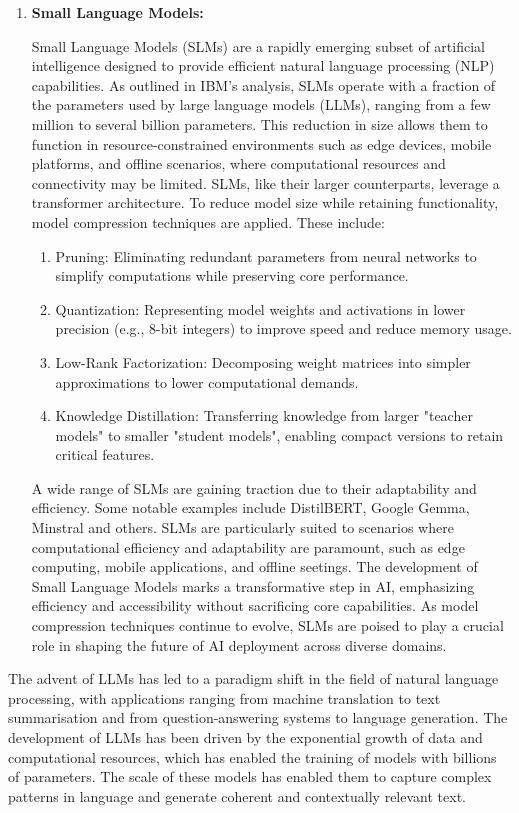 \begin{enumerate}
{\begin{enumerate}
{				            Recent studies have shown that size is not a deciding factor in the model's ability to perform step-by-step reasoning tasks. We will investigate this further in Section~\ref{subsec:cot-performance}.
			            }
		      \end{enumerate}
	      }
	\item \textbf{Small Language Models:} {
		      Small Language Models (SLMs) are a rapidly emerging subset of artificial intelligence designed to provide efficient natural language processing (NLP) capabilities. As outlined in IBM's analysis, SLMs operate with a fraction of the parameters used by large language models (LLMs), ranging from a few million to several billion parameters. This reduction in size allows them to function in resource-constrained environments such as edge devices, mobile platforms, and offline scenarios, where computational resources and connectivity may be limited.
		      SLMs, like their larger counterparts, leverage a transformer architecture.
		      To reduce model size while retaining functionality, model compression techniques are applied. These include:
		      \begin{enumerate}
			      \item Pruning: Eliminating redundant parameters from neural networks to simplify computations while preserving core performance.
			      \item Quantization: Representing model weights and activations in lower precision (e.g., 8-bit integers) to improve speed and reduce memory usage.
			      \item Low-Rank Factorization: Decomposing weight matrices into simpler approximations to lower computational demands.
			      \item Knowledge Distillation: Transferring knowledge from larger "teacher models" to smaller "student models", enabling compact versions to retain critical features.
		      \end{enumerate}
		      A wide range of SLMs are gaining traction due to their adaptability and efficiency. Some notable examples include DistilBERT, Google Gemma, Minstral and others.
		      SLMs are particularly suited to scenarios where computational efficiency and adaptability are paramount, such as edge computing, mobile applications, and offline seetings.
		      The development of Small Language Models marks a transformative step in AI, emphasizing efficiency and accessibility without sacrificing core capabilities. As model compression techniques continue to evolve, SLMs are poised to play a crucial role in shaping the future of AI deployment across diverse domains.
	      }
\end{enumerate}
The advent of LLMs has led to a paradigm shift in the field of natural language processing, with applications ranging from machine translation to text summarisation and from question-answering systems to language generation.
The development of LLMs has been driven by the exponential growth of data and computational resources, which has enabled the training of models with billions of parameters.
The scale of these models has enabled them to capture complex patterns in language and generate coherent and contextually relevant text.

